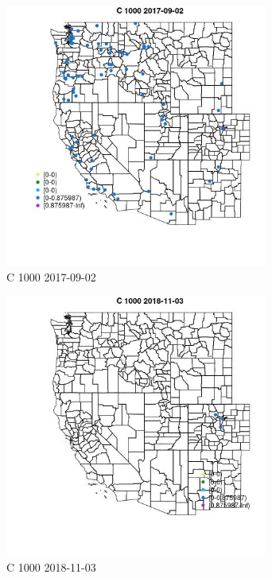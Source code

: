 \begin{figure} 
\centering  
\includegraphics[width=0.77\textwidth]{Code_Outputs/Report_ML_input_PM25_Step4_part_e_de_duplicated_aveswNAs_MapObsC_10002017-09-02.jpg} 
\caption{\label{fig:Report_ML_input_PM25_Step4_part_e_de_duplicated_aveswNAsMapObsC_10002017-09-02}C 1000 2017-09-02} 
\end{figure} 
 

\clearpage 

\begin{figure} 
\centering  
\includegraphics[width=0.77\textwidth]{Code_Outputs/Report_ML_input_PM25_Step4_part_e_de_duplicated_aveswNAs_MapObsC_10002018-11-03.jpg} 
\caption{\label{fig:Report_ML_input_PM25_Step4_part_e_de_duplicated_aveswNAsMapObsC_10002018-11-03}C 1000 2018-11-03} 
\end{figure} 
 

